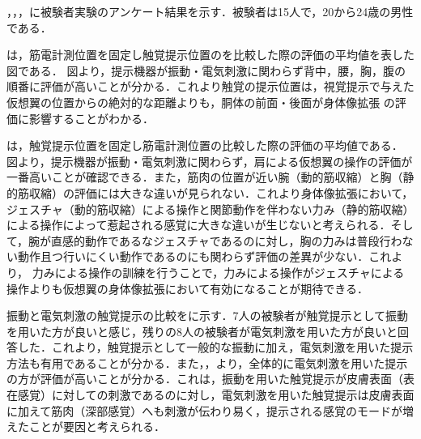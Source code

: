 
        ，，，に被験者実験のアンケート結果を示す．被験者は15人で，20から24歳の男性である．

        は，筋電計測位置を固定し触覚提示位置のを比較した際の評価の平均値を表した図である．
        図より，提示機器が振動・電気刺激に関わらず背中，腰，胸，腹の順番に評価が高いことが分かる．これより触覚の提示位置は，視覚提示で与えた仮想翼の位置からの絶対的な距離よりも，胴体の前面・後面が身体像拡張
        の評価に影響することがわかる．

        は，触覚提示位置を固定し筋電計測位置の比較した際の評価の平均値である．
        図より，提示機器が振動・電気刺激に関わらず，肩による仮想翼の操作の評価が一番高いことが確認できる．また，筋肉の位置が近い腕（動的筋収縮）と胸（静的筋収縮）の評価には大きな違いが見られない．これより身体像拡張において，ジェスチャ（動的筋収縮）による操作と関節動作を伴わない力み（静的筋収縮）による操作によって惹起される感覚に大きな違いが生じないと考えられる．そして，腕が直感的動作であるなジェスチャであるのに対し，胸の力みは普段行わない動作且つ行いにくい動作であるのにも関わらず評価の差異が少ない．これより，
        力みによる操作の訓練を行うことで，力みによる操作がジェスチャによる操作よりも仮想翼の身体像拡張において有効になることが期待できる．

        振動と電気刺激の触覚提示の比較をに示す．7人の被験者が触覚提示として振動を用いた方が良いと感じ，残りの8人の被験者が電気刺激を用いた方が良いと回答した．これより，触覚提示として一般的な振動に加え，電気刺激を用いた提示方法も有用であることが分かる．また，，より，全体的に電気刺激を用いた提示の方が評価が高いことが分かる．これは，振動を用いた触覚提示が皮膚表面（表在感覚）に対しての刺激であるのに対し，電気刺激を用いた触覚提示は皮膚表面に加えて筋肉（深部感覚）へも刺激が伝わり易く，提示される感覚のモードが増えたことが要因と考えられる．


